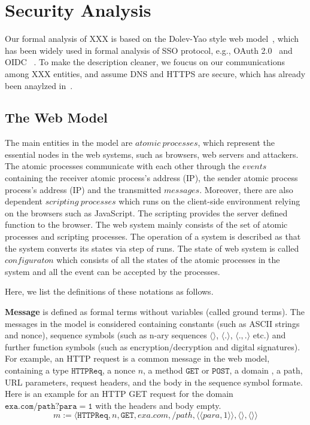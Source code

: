\section{Security Analysis}
Our formal analysis of XXX is based on the Dolev-Yao style web model~\cite{SPRESSO}, which has been widely used in formal analysis of SSO protocol, e.g., OAuth 2.0~\cite{FettKS16} and OIDC ~\cite{FettKS17}.
To make the description cleaner, we foucus on our communications among XXX entities, and assume DNS and HTTPS are secure, which has already been anaylzed in~\cite{SPRESSO}.


\subsection{The Web Model}

The main entities in the model are $atomic\ processes$, which represent the essential nodes in the web systems, such as browsers, web servers and attackers. The atomic processes communicate with each other through the $events$ containing the receiver atomic process's address (IP), the sender atomic process process's address (IP) and the transmitted $messages$. Moreover, there are also dependent $scripting\ processes$ which runs on the client-side environment relying on the browsers such as JavaScript. The scripting provides the server defined function to the browser.  The web system mainly consists of the set of atomic processes and scripting processes. The operation of a system is described as that the system converts its states via step of runs. The state of web system is called $configuraton$ which consists of all the states of the atomic processes in the system and all the event can be accepted by the processes.

Here, we list the definitions of these notations as follows. 


\vspace{1mm}\noindent\textbf{Message } is defined as formal terms without variables (called ground terms). The messages in the model is considered containing constants (such as ASCII strings and nonce), sequence symbols (such as n-ary sequences $\langle \rangle$, $\langle . \rangle$, $\langle . ,. \rangle$ etc.) and further function symbols (such as encryption/decryption and digital signatures). For example, an HTTP request is a common message in the web model, containing a type $\mathtt{HTTPReq}$, a nonce $n$, a method  $\mathtt{GET}$ or $\mathtt{POST}$,  a domain , a path, URL parameters, request headers, and the body  in the sequence symbol formate. Here is an example for an HTTP GET request for the domain  $\mathtt{exa.com/path?para=1}$ with the headers and body empty.
\begin{equation*}
    m:=\langle\mathtt{HTTPReq},n,\mathtt{GET},exa.com,/path,\langle \langle para, 1\rangle \rangle ,\langle \rangle,\langle \rangle \rangle
\end{equation*}

